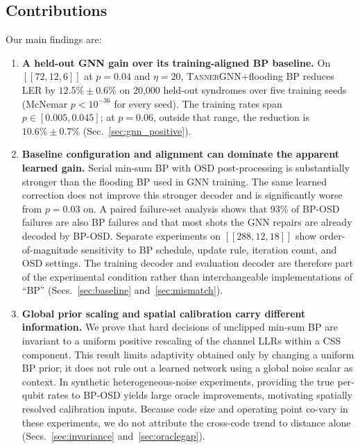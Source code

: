 \documentclass[a4paper,twocolumn,11pt,nopdfoutputerror]{quantumarticle}
\newcommand{\code}[3]{\ensuremath{[\![#1,#2,#3]\!]}}
\begin{document}
\subsection{Contributions}\label{sec:contributions}

Our main findings are:
\begin{enumerate}[leftmargin=*,topsep=3pt,itemsep=3pt]
\item \textbf{A held-out GNN gain over its training-aligned BP baseline.}
On $\code{72}{12}{6}$ at $p=0.04$ and $\eta=20$,
\textsc{TannerGNN}+flooding BP reduces LER by $12.5\%\pm0.6\%$ on
20{,}000 held-out syndromes over five training seeds (McNemar
$p<10^{-36}$ for every seed). The training rates span
$p\in[0.005,0.045]$; at $p=0.06$, outside that range, the reduction is
$10.6\%\pm0.7\%$ (Sec.~\ref{sec:gnn_positive}).

\item \textbf{Baseline configuration and alignment can dominate the
apparent learned gain.} Serial min-sum BP with OSD post-processing is
substantially stronger than the flooding BP used in GNN training. The
same learned correction does not improve this stronger decoder and is
significantly worse from $p=0.03$ on. A paired failure-set analysis shows
that 93\% of BP-OSD failures are also BP failures and that most shots
the GNN repairs are already decoded by BP-OSD. Separate experiments on
$\code{288}{12}{18}$ show order-of-magnitude sensitivity to BP schedule,
update rule, iteration count, and OSD settings. The
training decoder and evaluation decoder are therefore part of the
experimental condition rather than interchangeable implementations of
``BP''
(Secs.~\ref{sec:baseline} and~\ref{sec:mismatch}).

\item \textbf{Global prior scaling and spatial calibration carry
different information.} We prove that hard decisions of unclipped
min-sum BP are invariant to a uniform positive rescaling of the channel
LLRs within a CSS component. This result limits adaptivity obtained only
by changing a uniform BP prior; it does not rule out a learned network
using a global noise scalar as context. In synthetic heterogeneous-noise
experiments, providing the true per-qubit rates to BP-OSD yields large
oracle improvements, motivating spatially resolved calibration inputs.
Because code size and operating point co-vary in these experiments, we do
not attribute the cross-code trend to distance alone
(Secs.~\ref{sec:invariance} and~\ref{sec:oraclegap}).
\end{enumerate}
\end{document}
